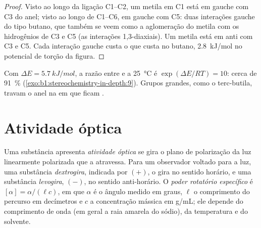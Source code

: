 \begin{proof}
Visto ao longo da ligação C1--C2, um metila  em C1 está em gauche
com C3 do anel; visto ao longo de C1--C6, em gauche com C5: duas
interações gauche do tipo butano, que também se veem como a aglomeração
do metila com os hidrogênios  de C3 e C5 (as interações
1,3-diaxiais). Um metila  está em anti com C3 e C5. Cada
interação gauche custa o que custa no butano, \qty{2.8}{kJ/mol} no
potencial de torção da figura.
\end{proof}

Com $\Delta E = \qty{5.7}{kJ/mol}$, a razão entre   e
 a \qty{25}{\celsius} é $\exp(\Delta E/RT) = 10$: cerca de
\qty{91}{\percent}  (\cref{exo:b1:stereochemistry-in-depth:9}).
Grupos grandes, como o terc-butila, travam o anel na  em que
ficam .

\section{Atividade óptica}

\begin{definition}\label{def:b1:stereochemistry-in-depth:optical-activity}
Uma substância apresenta \emph{atividade óptica} se gira
o plano de polarização da luz linearmente polarizada que a atravessa.
Para um observador voltado para a luz, uma substância
\emph{dextrogira}, indicada por $(+)$, o gira no
sentido horário, e uma substância \emph{levogira},
$(-)$, no sentido anti-horário. O \emph{poder rotatório
específico} é $[\alpha] = \alpha/(\ell c)$, em que
$\alpha$ é o ângulo medido em graus, $\ell$ o comprimento do percurso em
decímetros e $c$ a concentração mássica em \unit{g/mL}; ele depende do
comprimento de onda (em geral a raia amarela do sódio), da temperatura e
do solvente.
\end{definition}

